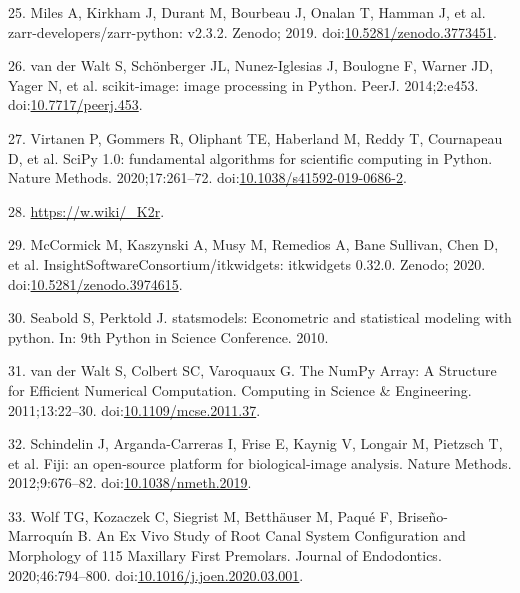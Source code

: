 \documentclass[
  american,
]{article}
\newenvironment{cslreferences}%
  {}%
  {\par}
\begin{document}
\begin{cslreferences}
\leavevmode\hypertarget{ref-10Fk3ASPz}{}%
25. Miles A, Kirkham J, Durant M, Bourbeau J, Onalan T, Hamman J, et al. zarr-developers/zarr-python: v2.3.2. Zenodo; 2019. doi:\href{https://doi.org/10.5281/zenodo.3773451}{10.5281/zenodo.3773451}.

\leavevmode\hypertarget{ref-stvWEJeu}{}%
26. van der Walt S, Schönberger JL, Nunez-Iglesias J, Boulogne F, Warner JD, Yager N, et al. scikit-image: image processing in Python. PeerJ. 2014;2:e453. doi:\href{https://doi.org/10.7717/peerj.453}{10.7717/peerj.453}.

\leavevmode\hypertarget{ref-8Miti2Gz}{}%
27. Virtanen P, Gommers R, Oliphant TE, Haberland M, Reddy T, Cournapeau D, et al. SciPy 1.0: fundamental algorithms for scientific computing in Python. Nature Methods. 2020;17:261--72. doi:\href{https://doi.org/10.1038/s41592-019-0686-2}{10.1038/s41592-019-0686-2}.

\leavevmode\hypertarget{ref-ydSnvH5h}{}%
28. \url{https://w.wiki/_K2r}.

\leavevmode\hypertarget{ref-v85zR2Z2}{}%
29. McCormick M, Kaszynski A, Musy M, Remedios A, Bane Sullivan, Chen D, et al. InsightSoftwareConsortium/itkwidgets: itkwidgets 0.32.0. Zenodo; 2020. doi:\href{https://doi.org/10.5281/zenodo.3974615}{10.5281/zenodo.3974615}.

\leavevmode\hypertarget{ref-E4OYV0qi}{}%
30. Seabold S, Perktold J. statsmodels: Econometric and statistical modeling with python. In: 9th Python in Science Conference. 2010.

\leavevmode\hypertarget{ref-OiM2HfsY}{}%
31. van der Walt S, Colbert SC, Varoquaux G. The NumPy Array: A Structure for Efficient Numerical Computation. Computing in Science \& Engineering. 2011;13:22--30. doi:\href{https://doi.org/10.1109/mcse.2011.37}{10.1109/mcse.2011.37}.

\leavevmode\hypertarget{ref-Fkmz2cmo}{}%
32. Schindelin J, Arganda-Carreras I, Frise E, Kaynig V, Longair M, Pietzsch T, et al. Fiji: an open-source platform for biological-image analysis. Nature Methods. 2012;9:676--82. doi:\href{https://doi.org/10.1038/nmeth.2019}{10.1038/nmeth.2019}.

\leavevmode\hypertarget{ref-jsWNcnau}{}%
33. Wolf TG, Kozaczek C, Siegrist M, Betthäuser M, Paqué F, Briseño-Marroquín B. An Ex Vivo Study of Root Canal System Configuration and Morphology of 115 Maxillary First Premolars. Journal of Endodontics. 2020;46:794--800. doi:\href{https://doi.org/10.1016/j.joen.2020.03.001}{10.1016/j.joen.2020.03.001}.


\end{cslreferences}
\end{document}
